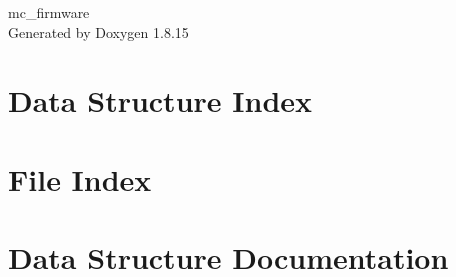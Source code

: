 \let\mypdfximage\pdfximage\def\pdfximage{\immediate\mypdfximage}\documentclass[twoside]{book}
\newcommand{\+}{\discretionary{\mbox{\scriptsize$\hookleftarrow$}}{}{}}
\newcommand{\clearemptydoublepage}{%
  \newpage{\pagestyle{empty}\cleardoublepage}%
}
\begin{document}
\hypersetup{pageanchor=false,
             bookmarksnumbered=true,
             pdfencoding=unicode
            }
\begin{titlepage}
\vspace*{7cm}
\begin{center}%
{\Large mc\+\_\+firmware }\\
\vspace*{1cm}
{\large Generated by Doxygen 1.8.15}\\
\end{center}
\end{titlepage}
\clearemptydoublepage
{}
\tableofcontents
\clearemptydoublepage
{}
\hypersetup{pageanchor=true}

\chapter{Data Structure Index}

\chapter{File Index}

\chapter{Data Structure Documentation}
















\end{document}
